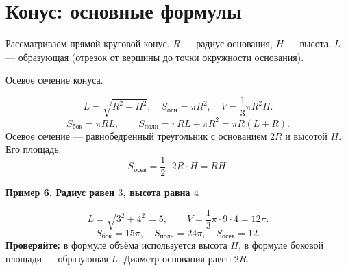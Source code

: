 \documentclass[a4paper,12pt]{article}
\newcommand{\sub}[1]{\par\medskip\textcolor{darkaccent}{\textbf{#1}}\par\smallskip}
\newcommand{\Sos}{S_{\text{осн}}}
\newcommand{\Sb}{S_{\text{бок}}}
\newcommand{\Sp}{S_{\text{полн}}}
\begin{document}
\section{Конус: основные формулы}
Рассматриваем прямой круговой конус. $R$ --- радиус основания, $H$ --- высота, $L$ --- образующая (отрезок от вершины до точки окружности основания).
\begin{center}
\par\small Осевое сечение конуса.
\end{center}
\[
L=\sqrt{R^2+H^2},\quad \Sos=\pi R^2,\quad V=\frac13\pi R^2H.
\]
\[
\Sb=\pi RL,\qquad \Sp=\pi RL+\pi R^2=\pi R(L+R).
\]
Осевое сечение --- равнобедренный треугольник с основанием $2R$ и высотой $H$. Его площадь:
\[
S_{\text{осев}}=\frac12\cdot2R\cdot H=RH.
\]
\sub{Пример 6. Радиус равен $3$, высота равна $4$}
\[
L=\sqrt{3^2+4^2}=5,\qquad V=\frac13\pi\cdot9\cdot4=12\pi.
\]
\[
\Sb=15\pi,\quad \Sp=24\pi,\quad S_{\text{осев}}=12.
\]
\textbf{Проверяйте:} в формуле объёма используется высота $H$, в формуле боковой площади --- образующая $L$. Диаметр основания равен $2R$.
\clearpage
\end{document}
